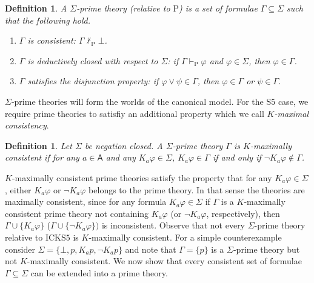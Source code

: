 \documentclass{myifcolog}
\newcommand{\K}{K}
\newcommand\IM{\mathsf{IM}}
\newcommand\A{\mathsf{A}}
\newcommand{\agi}{a}
\newcommand{\hickss}{\mathrm{ICKS5}}
\newtheorem{definition}[theorem]{Definition}
\numberwithin{theorem}{section}
\begin{document}
\begin{definition}\label{d: sigma prime theory}\index{prime theory!for $\IM$}
    A \emph{$\Sigma$-prime theory} (relative to $\mathrm{P}$) is a set of formulae $\Gamma \subseteq \Sigma$ such that the following hold.
    \begin{enumerate}
        \item $\Gamma$ is \emph{consistent}: $\Gamma \not \vdash_\mathrm{P} \bot$.
        \item $\Gamma$ is \emph{deductively closed} with respect to $\Sigma$: if $\Gamma \vdash_\mathrm{P} \varphi$ and $\varphi \in \Sigma$, then $\varphi \in \Gamma$.
        \item $\Gamma$ satisfies the \emph{disjunction property}: if $\varphi \vee \psi \in \Gamma$, then $\varphi \in \Gamma$ or $\psi \in \Gamma$.
    \end{enumerate}
\end{definition}

$\Sigma$-prime theories will form the worlds of the canonical model. For the S5 case, we require prime theories to satisfiy an additional property which we call \emph{$\K$-maximal consistency}.

\begin{definition}
   Let $\Sigma$ be negation closed. A $\Sigma$-prime theory $\Gamma$ is \emph{$\K$-maximally consistent} if for any $\agi \in \A$ and any $\K_\agi \varphi \in \Sigma$, $\K_\agi \varphi \in \Gamma$ if and only if $\neg \K_\agi \varphi \not \in \Gamma$.
\end{definition}

$\K$-maximally consistent prime theories satisfy the property that for any $\K_\agi \varphi \in \Sigma$, either $\K_\agi \varphi$ or $\neg \K_\agi \varphi$ belongs to the prime theory. In that sense the theories are maximally consistent, since for any formula $\K_\agi \varphi \in \Sigma$ if $\Gamma$ is a $\K$-maximally consistent prime theory not containing $\K_\agi \varphi$ (or $\neg \K_\agi \varphi$, respectively), then $\Gamma \cup \{ \K_\agi \varphi \}$ ($\Gamma \cup \{ \neg \K_\agi \varphi \})$ is inconsistent. Observe that not every $\Sigma$-prime theory relative to $\hickss$ is $\K$-maximally consistent. For a simple counterexample consider $\Sigma = \{\bot, p, \K_\agi p, \neg \K_\agi p\}$ and note that $\Gamma = \{p\}$ is a $\Sigma$-prime theory but not $K$-maximally consistent. We now show that every consistent set of formulae $\Gamma \subseteq \Sigma$ can be extended into a prime theory.
\end{document}
